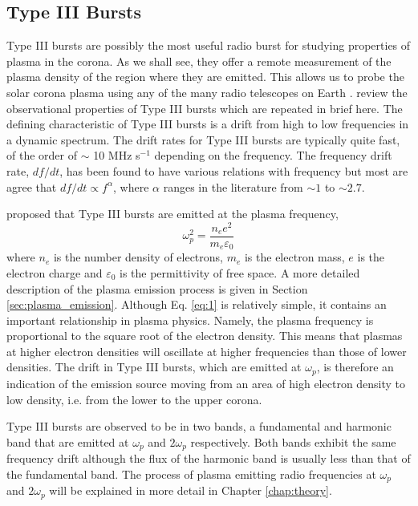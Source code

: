 \subsection{Type III Bursts}
\label{sec:typeIII} 
Type III bursts are possibly the most useful radio burst for studying properties of plasma in the corona. As we shall see, they offer a remote measurement of the plasma density of the region where they are emitted. This allows us to probe the solar corona plasma using any of the many radio telescopes on Earth \citep[e.g.]{Benz2004}.
\cite{Reid2014} review the observational properties of Type III bursts which are repeated in brief here. The defining characteristic of Type III bursts is a drift from high to low frequencies in a dynamic spectrum. The drift rates for Type III bursts are typically quite fast, of the order of $\sim$ 10 MHz s$^{-1}$ depending on the frequency. The frequency drift rate, $df/dt$, has been found to have various relations with frequency \citep{Reid2014} but most are agree that $df/dt \propto f^{\alpha}$, where $\alpha$ ranges in the literature from $\sim 1$ to $\sim 2.7$. 

\cite{Ginzburg1958} proposed that Type III bursts are emitted at the plasma frequency,
\begin{equation}\label{eq:1}
    \omega_{p}^2 = \frac{n_e e^2}{m_e \varepsilon_0}
\end{equation}
where $n_e$ is the number density of electrons, $m_e$ is the electron mass, $e$ is the electron charge and $\varepsilon_0$ is the permittivity of free space. A more detailed description of the plasma emission process is given in Section \ref{sec:plasma_emission}.
Although Eq. \ref{eq:1} is relatively simple, it contains an important relationship in plasma physics. Namely, the plasma frequency is proportional to the square root of the electron density. This means that plasmas at higher electron densities will oscillate at higher frequencies than those of lower densities. The drift in Type III bursts, which are emitted at $\omega_p$, is therefore an indication of the emission source moving from an area of high electron density to low density, i.e. from the lower to the upper corona.

Type III bursts are observed to be in two bands, a fundamental and harmonic band that are emitted at $\omega_p$ and $2 \omega_p$ respectively. Both bands exhibit the same frequency drift although the flux of the harmonic band is usually less than that of the fundamental band. The process of plasma emitting radio frequencies at $\omega_p$ and $2 \omega_p$ will be explained in more detail in Chapter \ref{chap:theory}. 

